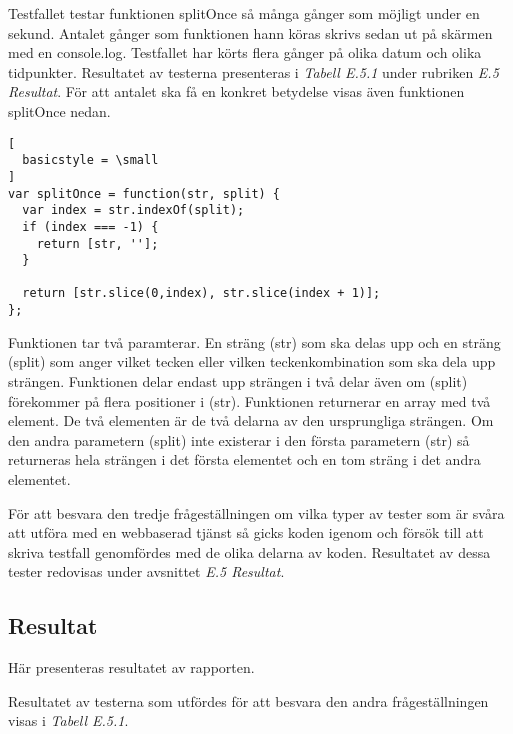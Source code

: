 Testfallet testar funktionen splitOnce så många gånger som möjligt
under en sekund. Antalet gånger som funktionen hann köras skrivs
sedan ut på skärmen med en console.log. 
Testfallet har körts flera gånger på olika datum och olika tidpunkter.
Resultatet av testerna presenteras i \emph{Tabell E.5.1}
under rubriken \emph{E.5 Resultat}.
För att antalet ska
få en konkret betydelse visas även funktionen splitOnce nedan.

\begin{lstlisting}[
  basicstyle = \small
]
var splitOnce = function(str, split) {
  var index = str.indexOf(split);
  if (index === -1) {
    return [str, ''];
  }

  return [str.slice(0,index), str.slice(index + 1)];
};
\end{lstlisting}

Funktionen tar två paramterar. En sträng (str) som ska delas upp och 
en sträng (split) som anger vilket tecken eller vilken teckenkombination
som ska dela upp strängen. Funktionen delar endast upp strängen i två delar
även om (split) förekommer på flera positioner i (str). Funktionen returnerar 
en array med två element.
De två elementen är de två delarna av den ursprungliga strängen. Om den andra
parametern (split) inte existerar i den första parametern (str) så returneras
hela strängen i det första elementet och en tom sträng i det andra elementet.

För att besvara den tredje frågeställningen om vilka typer av tester som är 
svåra att utföra med en webbaserad tjänst så gicks koden igenom och 
försök till att skriva testfall genomfördes
med de olika delarna av koden. Resultatet av dessa tester redovisas under 
avsnittet \emph{E.5 Resultat}.

\subsection{Resultat}
Här presenteras resultatet av rapporten.

Resultatet av testerna som utfördes för att besvara den andra frågeställningen
visas i \emph{Tabell E.5.1}.

